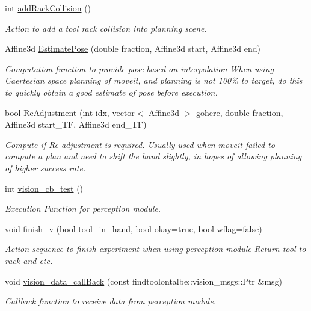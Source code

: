 \begin{DoxyCompactItemize}
int \hyperlink{structManipulate_a33209024eebea398fd7e81c493e0a049}{add\+Rack\+Collision} ()
\begin{DoxyCompactList}\small\item\em Action to add a tool rack collision into planning scene. \end{DoxyCompactList}\item 
Affine3d \hyperlink{structManipulate_a64a241674c3181908c7229fba21bd69b}{Estimate\+Pose} (double fraction, Affine3d start, Affine3d end)
\begin{DoxyCompactList}\small\item\em Computation function to provide pose based on interpolation When using Caertesian space planning of moveit, and planning is not 100\% to target, do this to quickly obtain a good estimate of pose before execution. \end{DoxyCompactList}\item 
bool \hyperlink{structManipulate_a64486e6e73ae0c3b64a2baf6a26a6e03}{Re\+Adjustment} (int idx, vector$<$ Affine3d $>$ gohere, double fraction, Affine3d start\+\_\+\+TF, Affine3d end\+\_\+\+TF)
\begin{DoxyCompactList}\small\item\em Compute if Re-\/adjustment is required. Usually used when moveit failed to compute a plan and need to shift the hand slightly, in hopes of allowing planning of higher success rate. \end{DoxyCompactList}\item 
int \hyperlink{structManipulate_a27f72bbd1c909b5fc1c06e320467a947}{vision\+\_\+cb\+\_\+test} ()
\begin{DoxyCompactList}\small\item\em Execution Function for perception module. \end{DoxyCompactList}\item 
void \hyperlink{structManipulate_ace713e3e91e90d051730ad0f98fc5126}{finish\+\_\+v} (bool tool\+\_\+in\+\_\+hand, bool okay=true, bool wflag=false)
\begin{DoxyCompactList}\small\item\em Action sequence to finish experiment when using perception module Return tool to rack and etc. \end{DoxyCompactList}\item 
void \hyperlink{structManipulate_ae32c3e2815aae04cc22224eddfa61078}{vision\+\_\+data\+\_\+call\+Back} (const findtoolontalbe\+::vision\+\_\+msgs\+::\+Ptr \&msg)
\begin{DoxyCompactList}\small\item\em Callback function to receive data from perception module. \end{DoxyCompactList}\item 

\end{DoxyCompactItemize}
